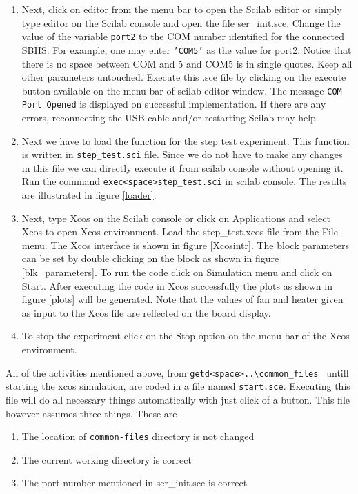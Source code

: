 \begin{enumerate}
\item Next, click on {\ttfamily editor} from the menu bar to open the Scilab editor or simply type {\ttfamily editor} on the Scilab console and open the file {\ttfamily ser\_init.sce}. Change the value of the variable {\tt port2} to the COM number identified for the connected SBHS. For example, one may enter {\tt 'COM5'} as the value for port2. Notice that there is no space between COM and 5 and COM5 is in single quotes.  Keep all other parameters untouched. Execute this .sce file by clicking on the execute button available on the menu bar of scilab editor window. The message {\tt COM Port Opened} is displayed on successful implementation. If there are any errors, reconnecting the USB cable and/or restarting Scilab may help.
\item Next we have to load the function for the step test experiment. This function is written in {\tt step\_test.sci} file. Since we do not have to make any changes in this file we can directly execute it from scilab console without opening it. Run the command {\tt exec<space>step\_test.sci} in scilab console.  The results are illustrated in figure \ref{loader}. 

\item Next, type {\ttfamily Xcos} on the Scilab console or click on { \ttfamily Applications} and select {\ttfamily Xcos} to open Xcos environment. Load the {\ttfamily step\_test.xcos} file from the { \ttfamily File} menu. The Xcos interface is shown in figure \ref{Xcosintr}. The block parameters can be set by double clicking on the block as shown in figure \ref{blk_parameters}. To run the code click on {\ttfamily Simulation} menu and click on {\ttfamily Start}. After executing the code in Xcos successfully the plots as shown in figure \ref{plots} will be generated. Note that the values of fan and heater given as input to the Xcos file are reflected on the board display. 
\item To stop the experiment click on the {\ttfamily Stop} option on the menu bar of the Xcos environment. 
\end{enumerate}



All of the activities mentioned above, from {\tt getd<space>..\textbackslash common\_files\ } untill starting the xcos simulation, are coded in a file named {\tt start.sce}. Executing this file will do all necessary things automatically with just click of a button. This file however assumes three things. These are

\begin{enumerate}
\item The location of {\tt common-files} directory is not changed 
\item The current working directory is correct
\item The port number mentioned in  {\ttfamily ser\_init.sce} is correct
\end{enumerate}

